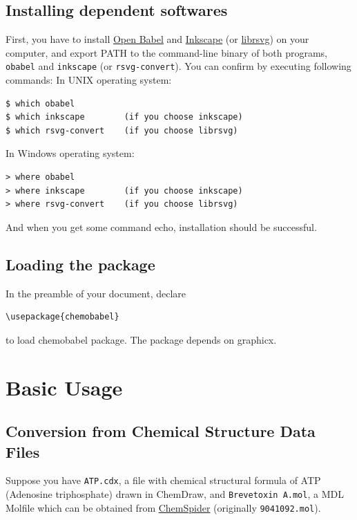 \documentclass[12pt]{ltjsarticle}
\begin{document}
\subsection{Installing dependent softwares}

First, you have to install \href{http://openbabel.org/}{Open Babel} and
\href{https://inkscape.org/en/}{Inkscape}
(or \href{http://librsvg.sourceforge.net/download/}{librsvg}) on your
computer, and export PATH to the command-line binary of both programs,
\verb+obabel+ and \verb+inkscape+ (or \verb+rsvg-convert+).
You can confirm by executing following commands:
In UNIX operating system:
\begin{verbatim}
$ which obabel
$ which inkscape        (if you choose inkscape)
$ which rsvg-convert    (if you choose librsvg)
\end{verbatim}

In Windows operating system:
\begin{verbatim}
> where obabel
> where inkscape        (if you choose inkscape)
> where rsvg-convert    (if you choose librsvg)
\end{verbatim}

And when you get some command echo, installation should be successful.

\subsection{Loading the package}

In the preamble of your document, declare
\begin{verbatim}
\usepackage{chemobabel}
\end{verbatim}
to load \textsf{chemobabel} package.
The package depends on \textsf{graphicx}.

\clearpage

\section{Basic Usage}
\label{basic}

\subsection{Conversion from Chemical Structure Data Files}

Suppose you have \verb|ATP.cdx|, a file with chemical structural formula
of ATP (Adenosine triphosphate) drawn in ChemDraw, and
\verb|Brevetoxin A.mol|, a MDL Molfile which can be obtained from
\href{http://www.chemspider.com/}{ChemSpider} (originally \verb|9041092.mol|).
\end{document}
